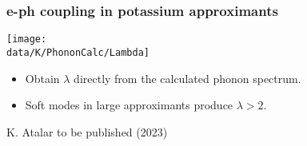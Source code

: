 \begin{frame}
\frametitle{e-ph coupling in potassium approximants}

\centerline{\texttt{[image: \\data/K/PhononCalc/Lambda]}}

\begin{itemize}
\item
Obtain $\lambda$ directly from the calculated phonon spectrum.
\item
Soft modes in large approximants produce $\lambda > 2$.

\end{itemize}

\vspace*{\fill}

\centerline{\makebox[\linewidth]{\rule{0.85\textwidth}{0.4pt}}}
\centerline{\scriptsize K. Atalar to be published (2023)}

\end{frame}



